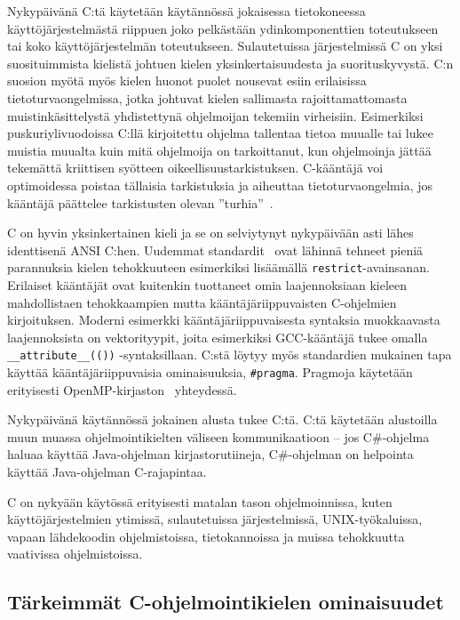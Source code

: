 Nykypäivänä C:tä käytetään käytännössä jokaisessa tietokoneessa
käyttöjärjestelmästä riippuen joko pelkästään ydinkomponenttien toteutukseen
tai koko käyttöjärjestelmän toteutukseen. Sulautetuissa järjestelmissä C on
yksi suosituimmista kielistä johtuen kielen yksinkertaisuudesta ja
suorituskyvystä. C:n suosion myötä myös kielen huonot puolet nousevat esiin
erilaisissa tietoturvaongelmissa, jotka johtuvat kielen sallimasta
rajoittamattomasta muistinkäsittelystä yhdistettynä ohjelmoijan tekemiin
virheisiin. Esimerkiksi puskuriylivuodoissa C:llä kirjoitettu ohjelma tallentaa
tietoa muualle tai lukee muistia muualta kuin mitä ohjelmoija on tarkoittanut,
kun ohjelmoinja jättää tekemättä kriittisen syötteen oikeellisuustarkistuksen.
C-kääntäjä voi optimoidessa poistaa tällaisia tarkistuksia ja aiheuttaa
tietoturvaongelmia, jos kääntäjä päättelee tarkistusten olevan
''turhia''~\citep{redhatsecurity}.

C on hyvin yksinkertainen kieli ja se on selviytynyt nykypäivään asti lähes
identtisenä ANSI C:hen. Uudemmat standardit~\citep{C99, C11, C18} ovat lähinnä
tehneet pieniä parannuksia kielen tehokkuuteen esimerkiksi lisäämällä
\texttt{restrict}-avainsanan. Erilaiset kääntäjät ovat kuitenkin tuottaneet
omia laajennoksiaan kieleen mahdollistaen tehokkaampien mutta
kääntäjäriippuvaisten C-ohjelmien kirjoituksen. Moderni esimerkki
kääntäjäriippuvaisesta syntaksia muokkaavasta laajennoksista on vektorityypit,
joita esimerkiksi GCC-kääntäjä tukee omalla \texttt{\_\_attribute\_\_(())}
-syntaksillaan. C:stä löytyy myös standardien mukainen tapa käyttää
kääntäjäriippuvaisia ominaisuuksia, \texttt{\#pragma}. Pragmoja käytetään
erityisesti OpenMP-kirjaston~\citep{openmp} yhteydessä.

Nykypäivänä käytännössä jokainen alusta tukee C:tä. C:tä käytetään alustoilla
muun muassa ohjelmointikielten väliseen kommunikaatioon -- jos C\#-ohjelma
haluaa käyttää Java-ohjelman kirjastorutiineja, C\#-ohjelman on helpointa
käyttää Java-ohjelman C-rajapintaa.

C on nykyään käytössä erityisesti matalan tason ohjelmoinnissa, kuten
käyttöjärjestelmien ytimissä, sulautetuissa järjestelmissä, UNIX-työkaluissa,
vapaan lähdekoodin ohjelmistoissa, tietokannoissa ja muissa tehokkuutta
vaativissa ohjelmistoissa.

\subsection{Tärkeimmät C-ohjelmointikielen ominaisuudet}
\label{sec:cominaisuudet}

